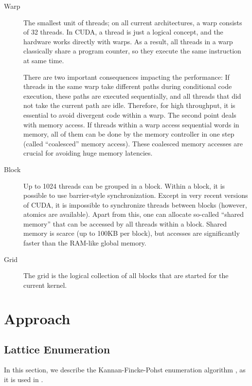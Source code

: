 \documentclass{scrartcl}
\begin{document}
    \begin{description}
        \item[Warp] The smallest unit of threads; on all current architectures, a warp consists of 32 threads. In CUDA, a thread is just a logical concept, and the hardware works directly with warps. As a result, all threads in a warp classically share a program counter, so they execute the same instruction at same time. 
        
        There are two important consequences impacting the performance: If threads in the same warp take different paths during conditional code execution, these paths are executed sequentially, and all threads that did not take the current path are idle. Therefore, for high throughput, it is essential to avoid divergent code within a warp.
        The second point deals with memory access. If threads within a warp access sequential words in memory, all of them can be done by the memory controller in one step (called ``coalesced'' memory access). These coalesced memory accesses are crucial for avoiding huge memory latencies.
        
        \item[Block] Up to 1024 threads can be grouped in a block. Within a block, it is possible to use barrier-style synchronization. Except in very recent versions of CUDA, it is impossible to synchronize threads between blocks (however, atomics are available). Apart from this, one can allocate so-called ``shared memory'' that can be accessed by all threads within a block. 
        Shared memory is scarce (up to 100KB per block), but accesses are significantly faster than the RAM-like global memory.
    
        \item[Grid] The grid is the logical collection of all blocks that are started for the current kernel.
    \end{description}

    \section{Approach}

    \label{sec:enumeration}

    \subsection{Lattice Enumeration}

    In this section, we describe the Kannan-Fincke-Pohst enumeration algorithm \cite{enum1, enum}, as it is used in \cite{fplll}.
\end{document}

